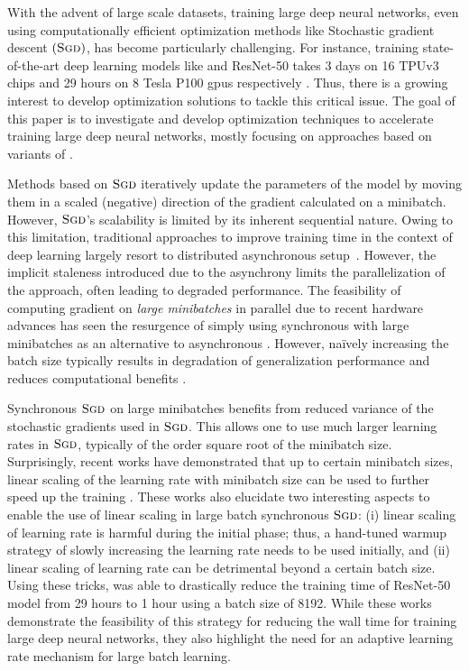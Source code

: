
With the advent of large scale datasets, training large deep neural networks, even using computationally efficient optimization methods like Stochastic gradient descent $(\textsc{Sgd})$, has become particularly challenging. For instance, training state-of-the-art deep learning models like \bert and ResNet-50 takes 3 days on 16 TPUv3 chips and 29 hours on 8 Tesla P100 gpus respectively \citep{devlin2018bert,he2016deep}. Thus, there is a growing interest to develop optimization solutions to tackle this critical issue. The goal of this paper is to investigate and develop optimization techniques to accelerate training large deep neural networks, mostly focusing on approaches based on variants of \sgd. 

Methods based on $\textsc{Sgd}$ iteratively update the parameters of the model by moving them in a scaled (negative) direction of the gradient calculated on a minibatch.   However, $\textsc{Sgd}$'s scalability is limited by its inherent sequential nature. Owing to this limitation, traditional approaches to improve \sgd training time in the context of deep learning largely resort to distributed asynchronous setup~\citep{dean2012large,recht2011hogwild}. However,  the implicit staleness introduced due to the asynchrony limits the parallelization of the approach, often leading to degraded performance. The feasibility of computing gradient on \emph{large minibatches} in parallel due to recent hardware advances has seen the resurgence of simply using synchronous \sgd with large minibatches as an alternative to asynchronous \sgd. However, na\"ively increasing the batch size typically results in degradation of generalization performance and reduces computational benefits \citep{goyal2017accurate}.

Synchronous $\textsc{Sgd}$ on large minibatches benefits from reduced variance of the stochastic gradients used in $\textsc{Sgd}$. This allows one to use much larger learning rates in $\textsc{Sgd}$, typically of the order square root of the minibatch size. Surprisingly, recent works have demonstrated that up to certain minibatch sizes, linear scaling of the learning rate with minibatch size can be used to further speed up the training \cite{goyal2017accurate}. These works also elucidate two interesting aspects to enable the use of linear scaling in large batch synchronous $\textsc{Sgd}$: (i) linear scaling of learning rate is harmful during the initial phase; thus, a hand-tuned warmup strategy of slowly increasing the learning rate needs to be used initially, and (ii) linear scaling of learning rate can be detrimental beyond a certain batch size. Using these tricks, \cite{goyal2017accurate} was able to drastically reduce the training time of ResNet-50 model from 29 hours to 1 hour using a batch size of 8192. While these works demonstrate the feasibility of this strategy for reducing the wall time for training large deep neural networks, they also highlight the need for an adaptive learning rate mechanism for large batch learning. 

